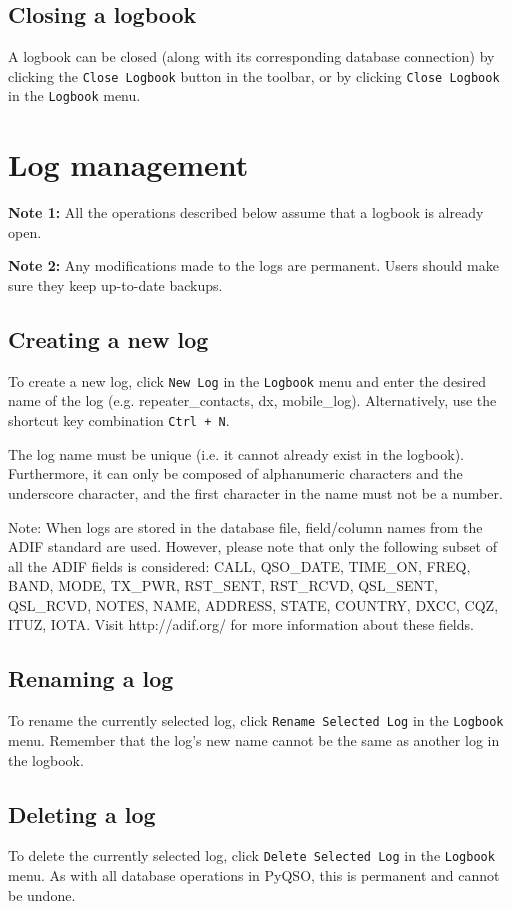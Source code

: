\documentclass[11pt, a4paper]{report}
\begin{document}
\section{Closing a logbook}
A logbook can be closed (along with its corresponding database connection) by clicking the \texttt{Close Logbook} button in the toolbar, or by clicking \texttt{Close Logbook} in the \texttt{Logbook} menu.

\chapter{Log management}\label{chap:log_management}
\noindent\textbf{Note 1:} All the operations described below assume that a logbook is already open.

\noindent\textbf{Note 2:} Any modifications made to the logs are permanent. Users should make sure they keep up-to-date backups.

\section{Creating a new log}
To create a new log, click \texttt{New Log} in the \texttt{Logbook} menu and enter the desired name of the log (e.g. repeater\_contacts, dx, mobile\_log). Alternatively, use the shortcut key combination \texttt{Ctrl + N}. 

The log name must be unique (i.e. it cannot already exist in the logbook). Furthermore, it can only be composed of alphanumeric characters and the underscore character, and the first character in the name must not be a number. 

Note: When logs are stored in the database file, field/column names from the ADIF standard are used. However, please note that only the following subset of all the ADIF fields is considered: CALL, QSO\_DATE, TIME\_ON, FREQ, BAND, MODE, TX\_PWR, RST\_SENT, RST\_RCVD, QSL\_SENT, QSL\_RCVD, NOTES, NAME, ADDRESS, STATE, COUNTRY, DXCC, CQZ, ITUZ, IOTA. Visit http://adif.org/ for more information about these fields.

\section{Renaming a log}
To rename the currently selected log, click \texttt{Rename Selected Log} in the \texttt{Logbook} menu. Remember that the log's new name cannot be the same as another log in the logbook.

\section{Deleting a log}
To delete the currently selected log, click \texttt{Delete Selected Log} in the \texttt{Logbook} menu. As with all database operations in PyQSO, this is permanent and cannot be undone.
\end{document}
